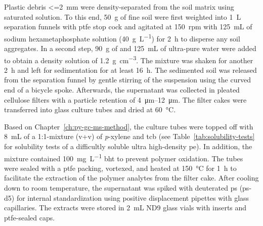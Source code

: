 Plastic debris \SI{<=2}{\milli\meter} were density-separated from the soil matrix using saturated  solution. To this end, \SI{50}{\gram} of fine soil were first weighted into \SI{1}{\liter} separation funnels with \ac{ptfe} stop cock and agitated at \SI{150}{rpm} with \SI{125}{\milli\liter} of sodium hexametaphosphate solution (\SI{40}{\gram\per\liter}) for \SI{2}{\hour} to disperse any soil aggregates. In a second step, \SI{90}{\gram} of  and \SI{125}{\milli\liter} of ultra-pure water were added to obtain a density solution of \SI{1.2}{\gram\per\cubic\centi\meter}. The mixture was shaken for another \SI{2}{\hour} and left for sedimentation for at least \SI{16}{\hour}. The sedimented soil was released from the separation funnel by gentle stirring of the suspension using the curved end of a bicycle spoke. Afterwards, the supernatant was collected in pleated cellulose filters with a particle retention of \SIrange{4}{12}{\micro\meter}. The filter cakes were transferred into glass culture tubes and dried at \SI{60}{\degreeCelsius}.

Based on Chapter~\ref{ch:py-gc-ms-method}, the culture tubes were topped off with \SI{8}{\milli\liter} of a 1:1-mixture (v+v) of \textit{p}-xylene and \ac{tcb} (see Table~\ref{tab:solubility-tests} for solubility tests of a difficultly soluble ultra high-density \ac{pe}). In addition, the mixture contained \SI{100}{\milli\gram\per\liter} \ac{bht} to prevent polymer oxidation.
The tubes were sealed with a \ac{ptfe} packing, vortexed, and heated at \SI{150}{\degreeCelsius} for \SI{1}{\hour} to facilitate the extraction of the polymer analytes from the filter cake.
After cooling down to room temperature, the supernatant was spiked with deuterated \ac{ps} (\ac{ps}-d5) for internal standardization using positive displacement pipettes with glass capillaries. The extracts were stored in \SI{2}{\milli\liter} ND9 glass vials with inserts and \ac{ptfe}-sealed caps.

